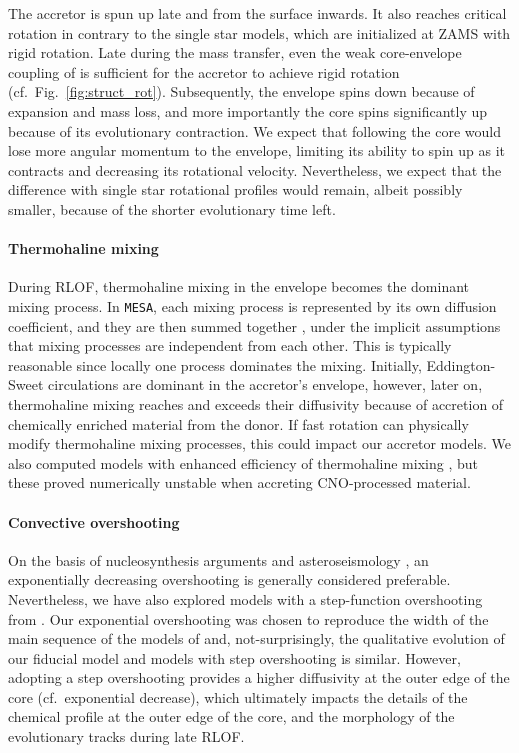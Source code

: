 \documentclass[twocolumn,twocolappendix,trackchanges]{aastex63}
\newcommand{\code}[1]{\texttt{#1}}
\newcommand{\MESA}{\code{MESA}}
\DeclareRobustCommand{\Figref}[1]{Fig.~\ref{#1}}
\begin{document}
The accretor is spun up late and from the surface inwards. It also
reaches critical rotation in contrary to the single star models, which
are initialized at ZAMS with rigid rotation. Late during the mass
transfer, even the weak core-envelope coupling of \cite{spruit:02} is
sufficient for the accretor to achieve rigid rotation (cf.\
\Figref{fig:struct_rot}). Subsequently, the envelope spins down
because of expansion and mass loss, and more importantly the core spins
significantly up because of its evolutionary contraction. We expect
that following \cite{fuller:19} the core would lose more angular
momentum to the envelope, limiting its ability to spin up as it
contracts and decreasing its rotational velocity.  Nevertheless, we
expect that the difference with single star rotational profiles would
remain, albeit possibly smaller, because of the shorter evolutionary
time left.

\paragraph{Thermohaline mixing}
During RLOF, thermohaline mixing in the envelope becomes the dominant
mixing process. In \MESA, each mixing process is represented by its
own diffusion coefficient, and they are then summed together
\citep{paxton:11}, under the implicit assumptions that mixing
processes are independent from each other. This is typically
reasonable since locally one process dominates the mixing.  Initially,
Eddington-Sweet circulations are dominant in the accretor's envelope,
however, later on, thermohaline mixing reaches and exceeds their
diffusivity because of accretion of
chemically enriched material from the donor. If fast rotation can
physically modify thermohaline mixing processes, this could impact our
accretor models. We also computed models with enhanced efficiency of
thermohaline mixing \citep[100 times higher,
][]{schootemeijer:19}, but these proved numerically unstable when
accreting CNO-processed material.

\paragraph{Convective overshooting}
On the basis of nucleosynthesis arguments \citep[e.g.,][]{herwig:00}
and asteroseismology \citep[e.g.,][]{moravveji:16}, an exponentially
decreasing overshooting is generally considered
preferable. Nevertheless, we have also explored models with a
step-function overshooting from \cite{brott:11}. Our
exponential overshooting \citep{claret:17} was chosen to reproduce the width of the
main sequence of the models of \cite{brott:11} and, not-surprisingly,
the qualitative evolution of our fiducial model and models with step
overshooting is similar. However, adopting a step overshooting
provides a higher diffusivity at the outer edge of the core (cf.\
exponential decrease), which ultimately impacts the details of the
chemical profile at the outer edge of the core, and the morphology of
the evolutionary tracks during late RLOF.
\end{document}
